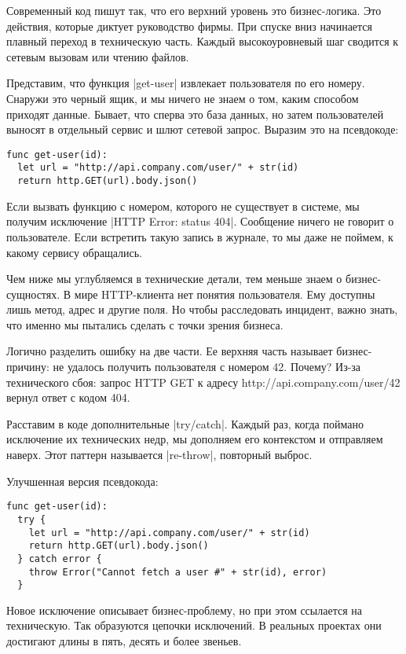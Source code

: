 Современный код пишут так, что его верхний уровень это бизнес-логика. Это
действия, которые диктует руководство фирмы. При спуске вниз начинается плавный
переход в техническую часть. Каждый высокоуровневый шаг сводится к сетевым
вызовам или чтению файлов.

Представим, что функция \spverb|get-user| извлекает пользователя по его номеру. Снаружи
это черный ящик, и мы ничего не знаем о том, каким способом приходят
данные. Бывает, что сперва это база данных, но затем пользователей выносят в
отдельный сервис и шлют сетевой запрос. Выразим это на псевдокоде:

\begin{verbatim}
func get-user(id):
  let url = "http://api.company.com/user/" + str(id)
  return http.GET(url).body.json()
\end{verbatim}

Если вызвать функцию с номером, которого не существует в системе, мы получим
исключение \spverb|HTTP Error: status 404|. Сообщение ничего не говорит о
пользователе. Если встретить такую запись в журнале, то мы даже не поймем, к
какому сервису обращались.

Чем ниже мы углубляемся в технические детали, тем меньше знаем о
бизнес-сущностях. В мире HTTP-клиента нет понятия пользователя. Ему доступны
лишь метод, адрес и другие поля. Но чтобы расследовать инцидент, важно знать,
что именно мы пытались сделать с точки зрения бизнеса.

Логично разделить ошибку на две части. Ее верхняя часть называет бизнес-причину:
не удалось получить пользователя с номером 42. Почему? Из-за технического сбоя:
запрос HTTP GET к адресу http://api.company.com/user/42 вернул ответ с кодом
404.

Расставим в коде дополнительные \spverb|try/catch|. Каждый раз, когда поймано
исключение их технических недр, мы дополняем его контекстом и отправляем
наверх. Этот паттерн называется \spverb|re-throw|, повторный выброс.

Улучшенная версия псевдокода:

\begin{verbatim}
func get-user(id):
  try {
    let url = "http://api.company.com/user/" + str(id)
    return http.GET(url).body.json()
  } catch error {
    throw Error("Cannot fetch a user #" + str(id), error)
  }
\end{verbatim}

Новое исключение описывает бизнес-проблему, но при этом ссылается на
техническую. Так образуются цепочки исключений. В реальных проектах они
достигают длины в пять, десять и более звеньев.

